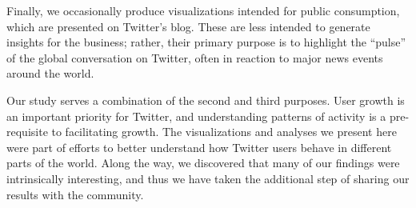 \documentclass[letterpaper]{article}
\begin{document}
Finally, we occasionally produce visualizations intended for public
consumption, which are presented on Twitter's blog. These are less
intended to generate insights for the business; rather, their primary
purpose is to highlight the ``pulse'' of the global conversation on
Twitter, often in reaction to major news events around the world.

Our study serves a combination of the second and third purposes. User
growth is an important priority for Twitter, and understanding
patterns of activity is a pre-requisite to facilitating growth. The
visualizations and analyses we present here were part of efforts to
better understand how Twitter users behave in different parts of the
world. Along the way, we discovered that many of our findings were
intrinsically interesting, and thus we have taken the additional step
of sharing our results with the community.
\end{document}
